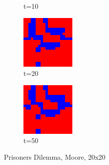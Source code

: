 \documentclass[a4paper, 11pt]{article}
\begin{document}
\begin{figure}[H]
\begin{subfigure}{.33\textwidth}
  \caption{t=10}
\end{subfigure}%
\begin{subfigure}{.33\textwidth}
  \centering
  \includegraphics[width=0.9\linewidth]{PRISONERS_DILEMMA_MOORE_20x20_t20}
  \caption{t=20}
\end{subfigure}%
\begin{subfigure}{.33\textwidth}
  \centering
  \includegraphics[width=0.9\linewidth]{PRISONERS_DILEMMA_MOORE_20x20_t50}
  \caption{t=50}
\end{subfigure}
\caption{Prisoners Dilemma, Moore, 20x20}
\end{figure}
\end{document}
